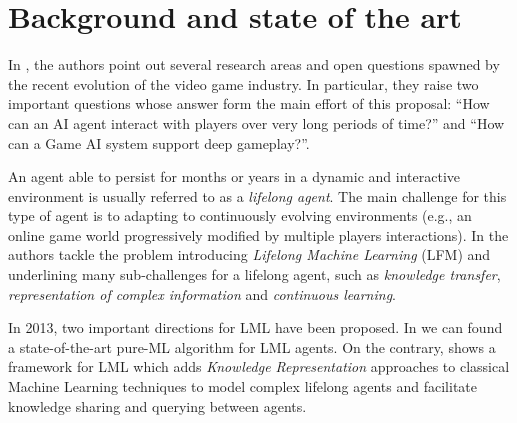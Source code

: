 \section{Background and state of the art}\label{sect:background}

In \cite{riedl2013}, the authors point out several research areas and open questions spawned by the recent evolution of the video game industry. In particular, they raise two important questions whose answer form the main effort of this proposal: ``How can an AI agent interact with players over very long periods of time?'' and ``How can a Game AI system support deep gameplay?''.

An agent able to persist for months or years in a dynamic and interactive environment is usually referred to as a \emph{lifelong agent}. The main challenge for this type of agent is to adapting to continuously evolving environments (e.g., an online game world progressively modified by multiple players interactions). In \cite{thrun1995lifelong} the authors tackle the problem introducing \emph{Lifelong Machine Learning} (LFM) and underlining many sub-challenges for a lifelong agent, such as \emph{knowledge transfer}, \emph{representation of complex information} and \emph{continuous learning}.

In 2013, two important directions for LML have been proposed. In \cite{eaton2013ella} we can found a state-of-the-art pure-ML algorithm for LML agents. On the contrary, \cite{silver2013} shows a framework for LML which adds \emph{Knowledge Representation} approaches to classical Machine Learning techniques to model complex lifelong agents and facilitate knowledge sharing and querying between agents.

